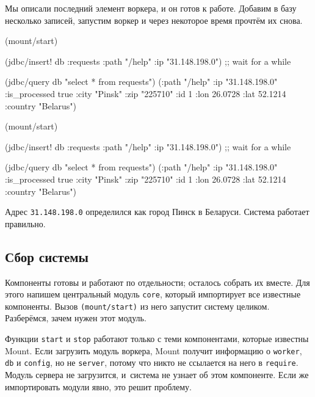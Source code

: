 Мы описали последний элемент воркера, и он готов к работе. Добавим в базу
несколько записей, запустим воркер и через некоторое время прочтём их снова.

\pagebreaklarge[3]

\ifnarrow

\begin{english}
  \begin{clojure}
(mount/start)

(jdbc/insert! db :requests
  {:path "/help" :ip "31.148.198.0"})
;; wait for a while

(jdbc/query db "select * from requests")
({:path "/help"
  :ip "31.148.198.0"
  :is_processed true
  :city "Pinsk"
  :zip "225710" :id 1
  :lon 26.0728 :lat 52.1214
  :country "Belarus"})
  \end{clojure}
\end{english}

\else

\begin{english}
  \begin{clojure}
(mount/start)

(jdbc/insert! db :requests
              {:path "/help" :ip "31.148.198.0"})
;; wait for a while

(jdbc/query db "select * from requests")
({:path "/help" :ip "31.148.198.0" :is_processed true
  :city "Pinsk" :zip "225710" :id 1
  :lon 26.0728 :lat 52.1214 :country "Belarus"})
  \end{clojure}
\end{english}

\fi

Адрес \verb|31.148.198.0| определился как город Пинск в Беларуси. Система
работает правильно.

\subsection{Сбор системы}


Компоненты готовы и работают по отдельности; осталось собрать их вместе. Для
этого напишем центральный модуль \verb|core|, который импортирует все известные
компоненты. Вызов \verb|(mount/start)| из него запустит систему
целиком. Разберёмся, зачем нужен этот модуль.

Функции \verb|start| и \verb|stop| работают только с теми компонентами, которые
известны Mount. Если загрузить модуль воркера, Mount получит информацию о
\verb|worker|, \verb|db| и \verb|config|, но не \verb|server|, потому что никто
не ссылается на него в \verb|require|. Модуль сервера не загрузится, и~система
не узнает об этом компоненте. Если же импортировать модули явно, это решит
проблему.

